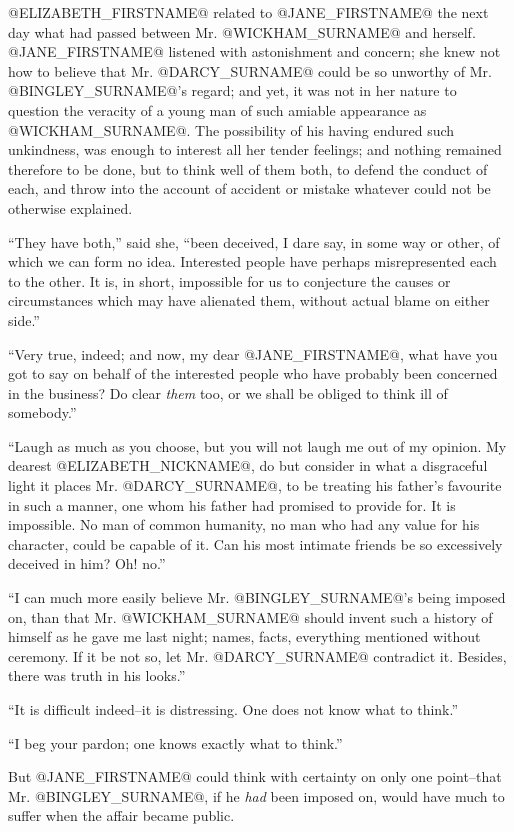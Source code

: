 @ELIZABETH_FIRSTNAME@ related to @JANE_FIRSTNAME@ the next day what had passed between Mr.
@WICKHAM_SURNAME@ and herself. @JANE_FIRSTNAME@ listened with astonishment and concern; she
knew not how to believe that Mr. @DARCY_SURNAME@ could be so unworthy of Mr.
@BINGLEY_SURNAME@'s regard; and yet, it was not in her nature to question the
veracity of a young man of such amiable appearance as @WICKHAM_SURNAME@. The
possibility of his having endured such unkindness, was enough to
interest all her tender feelings; and nothing remained therefore to be
done, but to think well of them both, to defend the conduct of each,
and throw into the account of accident or mistake whatever could not be
otherwise explained.

``They have both,'' said she, ``been deceived, I dare say, in some way
or other, of which we can form no idea. Interested people have perhaps
misrepresented each to the other. It is, in short, impossible for us to
conjecture the causes or circumstances which may have alienated them,
without actual blame on either side.''

``Very true, indeed; and now, my dear @JANE_FIRSTNAME@, what have you got to say on
behalf of the interested people who have probably been concerned in the
business? Do clear \textit{them} too, or we shall be obliged to think ill of
somebody.''

``Laugh as much as you choose, but you will not laugh me out of my
opinion. My dearest @ELIZABETH_NICKNAME@, do but consider in what a disgraceful light
it places Mr. @DARCY_SURNAME@, to be treating his father's favourite in such
a manner, one whom his father had promised to provide for. It is
impossible. No man of common humanity, no man who had any value for his
character, could be capable of it. Can his most intimate friends be so
excessively deceived in him? Oh! no.''

``I can much more easily believe Mr. @BINGLEY_SURNAME@'s being imposed on, than
that Mr. @WICKHAM_SURNAME@ should invent such a history of himself as he gave me
last night; names, facts, everything mentioned without ceremony. If it
be not so, let Mr. @DARCY_SURNAME@ contradict it. Besides, there was truth in his
looks.''

``It is difficult indeed--it is distressing. One does not know what to
think.''

``I beg your pardon; one knows exactly what to think.''

But @JANE_FIRSTNAME@ could think with certainty on only one point--that Mr. @BINGLEY_SURNAME@,
if he \textit{had} been imposed on, would have much to suffer when the affair
became public.

